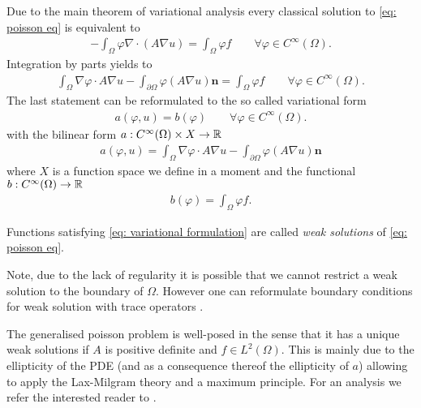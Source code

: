 \begin{definition} 
Due to the main theorem of variational analysis every classical solution to \eqref{eq: poisson eq} is equivalent to 
\begin{align}
	-\int_\Omega \varphi \nabla \cdot (A \nabla u) = \int_\Omega \varphi f \qquad \forall \varphi \in C^\infty(\Omega).\label{eq: variational form}
\end{align}
Integration by parts yields to
\begin{align}
	\int_\Omega \nabla \varphi  \cdot A\nabla u -\int_{\partial \Omega} \varphi (A\nabla u) \mathbf{n}  = \int_\Omega \varphi f \qquad \forall \varphi \in C^\infty(\Omega). \label{eq: FE integration by parts}
\end{align}
The last statement can be reformulated to the so called variational form 
\begin{align}
a(\varphi,u)  = b(\varphi) \qquad \forall \varphi \in C^\infty(\Omega). \label{eq: variational formulation}
\end{align}
with the bilinear form $a:C^\infty(\Omega) \times X \rightarrow \mathbb{R}$
\begin{align*}
a(\varphi,u) = \int_\Omega \nabla \varphi  \cdot A\nabla u -\int_{\partial \Omega} \varphi (A\nabla u) \mathbf{n}
\end{align*}
where $X$ is a function space we define in a moment and the functional $b:C^\infty(\Omega) \rightarrow \mathbb{R}$
\begin{align*}
 b(\varphi)  = \int_\Omega \varphi f.
\end{align*}


\begin{definition}
	Functions satisfying \eqref{eq: variational formulation} are called \emph{weak solutions} of \eqref{eq: poisson eq}.
\end{definition}
Note, due to the lack of regularity it is possible that we cannot restrict a weak solution to the boundary of $\Omega$. However one can reformulate boundary conditions for weak solution with trace operators \cite[Section 5.5]{Evans1998}.

The generalised poisson problem is well-posed in the sense that it has a unique weak solutions if $A$ is positive definite and $f\in L^2(\Omega)$. This is mainly due to the ellipticity of the PDE (and as a consequence thereof the ellipticity of $a$) allowing to apply the Lax-Milgram theory and a maximum principle. For an analysis we refer the interested reader to \cite[Chapter~6]{Evans1998}.


\end{definition}
